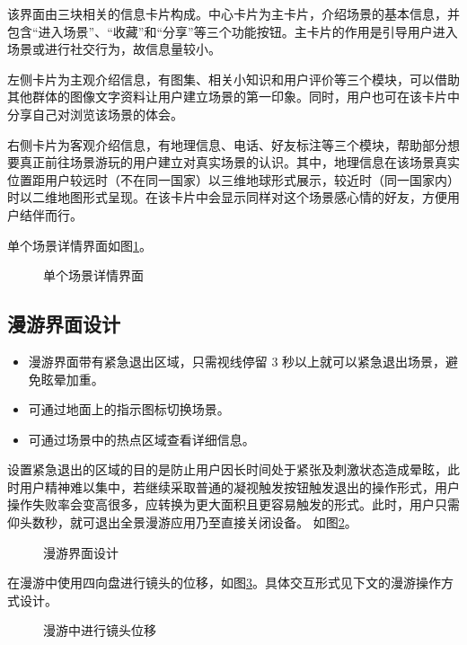 该界面由三块相关的信息卡片构成。中心卡片为主卡片，介绍场景的基本信息，并包含“进入场景”、“收藏”和“分享”等三个功能按钮。主卡片的作用是引导用户进入场景或进行社交行为，故信息量较小。

左侧卡片为主观介绍信息，有图集、相关小知识和用户评价等三个模块，可以借助其他群体的图像文字资料让用户建立场景的第一印象。同时，用户也可在该卡片中分享自己对浏览该场景的体会。

右侧卡片为客观介绍信息，有地理信息、电话、好友标注等三个模块，帮助部分想要真正前往场景游玩的用户建立对真实场景的认识。其中，地理信息在该场景真实位置距用户较远时（不在同一国家）以三维地球形式展示，较近时（同一国家内）时以二维地图形式呈现。在该卡片中会显示同样对这个场景感心情的好友，方便用户结伴而行。

单个场景详情界面如图\ref{fig:d-07}。

\begin{figure}[htp]
\centering
{}
\caption{单个场景详情界面}
\label{fig:d-07}
\end{figure}

\subsection{漫游界面设计}
\begin{itemize}
	\item 漫游界面带有紧急退出区域，只需视线停留 3 秒以上就可以紧急退出场景，避免眩晕加重。
	\item 可通过地面上的指示图标切换场景。
	\item 可通过场景中的热点区域查看详细信息。
\end{itemize}

设置紧急退出的区域的目的是防止用户因长时间处于紧张及刺激状态造成晕眩，此时用户精神难以集中，若继续采取普通的凝视触发按钮触发退出的操作形式，用户操作失败率会变高很多，应转换为更大面积且更容易触发的形式。此时，用户只需仰头数秒，就可退出全景漫游应用乃至直接关闭设备。
如图\ref{fig:scenery}。

\begin{figure}[htp]
\centering
{}
\caption{漫游界面设计}
\label{fig:scenery}
\end{figure}

在漫游中使用四向盘进行镜头的位移，如图\ref{fig:d-10}。具体交互形式见下文的漫游操作方式设计。

\begin{figure}[htp]
\centering
{}
\caption{漫游中进行镜头位移}
\label{fig:d-10}
\end{figure}

